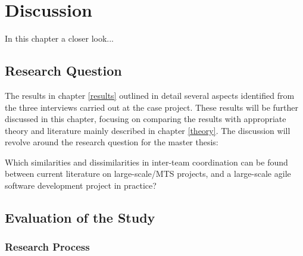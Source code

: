 \chapter{Discussion}
\label{disc}

\minitoc

In this chapter a closer look...
\newpage

\section{Research Question}

The results in chapter \ref{results} outlined in detail several aspects identified from the three interviews carried out at the case project. These results will be further discussed in this chapter, focusing on comparing the results with appropriate theory and literature mainly described in chapter \ref{theory}. The discussion will revolve around the research question for the master thesis:

\begin{fancyquotes}
Which similarities and dissimilarities in inter-team coordination can be found between current literature on large-scale/MTS projects, and a large-scale agile software development project in practice?
\end{fancyquotes}


\section{Evaluation of the Study}

\subsection{Research Process}

